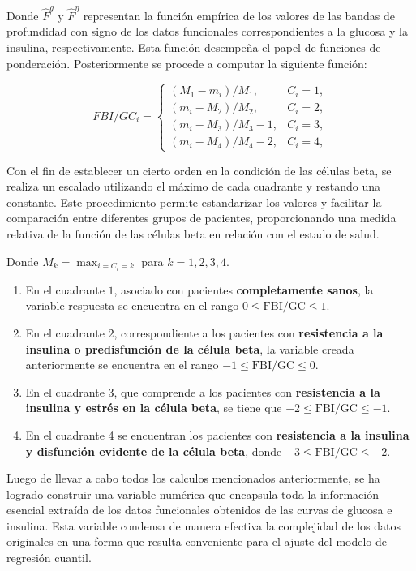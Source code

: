 Donde $\widehat{F}^g$ y $\widehat{F}^{\eta}$ representan la función empírica de los valores de las bandas de profundidad con signo de los datos funcionales correspondientes a la glucosa y la insulina, respectivamente. Esta función desempeña el papel de funciones de ponderación. Posteriormente se procede a computar la siguiente función:

\begin{equation}
    F B I / G C_i= \begin{cases}\left(M_1-m_i\right) / M_1, & C_i=1, \\ \left(m_i-M_2\right) / M_2, & C_i=2, \\ \left(m_i-M_3\right) / M_3-1, & C_i=3, \\ \left(m_i-M_4\right) / M_4-2, & C_i=4,\end{cases}
\end{equation}

Con el fin de establecer un cierto orden en la condición de las células beta, se realiza un escalado utilizando el máximo de cada cuadrante y restando una constante. Este procedimiento permite estandarizar los valores y facilitar la comparación entre diferentes grupos de pacientes, proporcionando una medida relativa de la función de las células beta en relación con el estado de salud.

Donde $M_k = \max_{i = C_i = k}$ para $k = 1, 2, 3, 4$.

\begin{enumerate}
    \item En el cuadrante $1$, asociado con pacientes \textbf{completamente sanos}, la variable respuesta se encuentra en el rango $0 \leq \text{FBI/GC} \leq 1$.
    \item En el cuadrante $2$, correspondiente a los pacientes con \textbf{resistencia a la insulina o predisfunción de la célula beta}, la variable creada anteriormente se encuentra en el rango $-1 \leq \text{FBI/GC} \leq 0$.
    \item En el cuadrante $3$, que comprende a los pacientes con \textbf{resistencia a la insulina y estrés en la célula beta}, se tiene que $-2 \leq \text{FBI/GC} \leq -1$.
    \item En el cuadrante 4 se encuentran los pacientes con \textbf{resistencia a la insulina y disfunción evidente de la célula beta}, donde $-3 \leq \text{FBI/GC} \leq -2$.
\end{enumerate}

 Luego de llevar a cabo todos los calculos mencionados anteriormente, se ha logrado construir una variable numérica que encapsula toda la información esencial extraída de los datos funcionales obtenidos de las curvas de glucosa e insulina. Esta variable condensa de manera efectiva la complejidad de los datos originales en una forma que resulta conveniente para el ajuste del modelo de regresión cuantil.